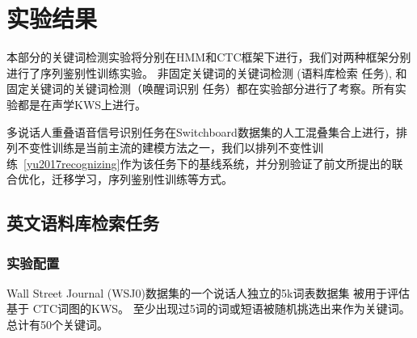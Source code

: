 \section{实验结果}
\label{chap:kws-exp}


本部分的关键词检测实验将分别在HMM和CTC框架下进行，我们对两种框架分别进行了序列鉴别性训练实验。
非固定关键词的关键词检测 (语料库检索 任务), 和固定关键词的关键词检测（唤醒词识别 任务）都在实验部分进行了考察。所有实验都是在声学KWS上进行。


多说话人重叠语音信号识别任务在Switchboard数据集的人工混叠集合上进行，排列不变性训练是当前主流的建模方法之一，我们以排列不变性训练~\ref{yu2017recognizing}作为该任务下的基线系统，并分别验证了前文所提出的联合优化，迁移学习，序列鉴别性训练等方式。

\subsection{英文语料库检索任务}
\label{Sec:exp-sp-docu-detri}

\subsubsection{实验配置}
\label{Sec:exp-sp-docu-detri-setup}

Wall Street Journal (WSJ0)数据集的一个说话人独立的5k词表数据集 \cite{garofalo1993continous} 被用于评估基于 CTC词图的KWS。 至少出现过5词的词或短语被随机挑选出来作为关键词。总计有50个关键词。


